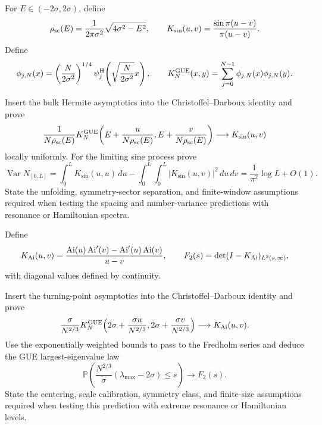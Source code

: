 \begin{exercise}
For $E\in(-2\sigma,2\sigma)$, define
\[
\rho_{\rm sc}(E)=\frac1{2\pi\sigma^2}\sqrt{4\sigma^2-E^2},
\qquad
K_{\sin}(u,v)=\frac{\sin\pi(u-v)}{\pi(u-v)}.
\]
Define
\[
\phi_{j,N}(x)
=\left(\frac{N}{2\sigma^2}\right)^{1/4}
\psi_j^{\rm H}\!\left(\sqrt{\frac{N}{2\sigma^2}}x\right),
\qquad
K_N^{\rm GUE}(x,y)=\sum_{j=0}^{N-1}\phi_{j,N}(x)\phi_{j,N}(y).
\]

Insert the bulk Hermite asymptotics into the Christoffel--Darboux identity
and prove
\[
\frac{1}{N\rho_{\rm sc}(E)}
K_N^{\rm GUE}\!\left(
E+\frac{u}{N\rho_{\rm sc}(E)},
E+\frac{v}{N\rho_{\rm sc}(E)}\right)
\longrightarrow K_{\sin}(u,v)
\]
locally uniformly.  For the limiting sine process prove
\[
\operatorname{Var}N_{[0,L]}
=\int_0^LK_{\sin}(u,u)\,du
-\int_0^L\!\int_0^L|K_{\sin}(u,v)|^2\,du\,dv
=\frac1{\pi^2}\log L+O(1).
\]
State the unfolding, symmetry-sector separation, and finite-window
assumptions required when testing the spacing and number-variance predictions
with resonance or Hamiltonian spectra.
\end{exercise}

\begin{exercise}
Define
\[
K_{\rm Ai}(u,v)
=\frac{\operatorname{Ai}(u)\operatorname{Ai}'(v)
-\operatorname{Ai}'(u)\operatorname{Ai}(v)}{u-v},
\qquad
F_2(s)=\det(I-K_{\rm Ai})_{L^2(s,\infty)},
\]
with diagonal values defined by continuity.

Insert the turning-point asymptotics into the Christoffel--Darboux identity
and prove
\[
\frac{\sigma}{N^{2/3}}
K_N^{\rm GUE}\!\left(
2\sigma+\frac{\sigma u}{N^{2/3}},
2\sigma+\frac{\sigma v}{N^{2/3}}\right)
\longrightarrow K_{\rm Ai}(u,v).
\]
Use the exponentially weighted bounds to pass to the Fredholm series and
deduce the GUE largest-eigenvalue law
\[
\mathbb P\!\left(
\frac{N^{2/3}}{\sigma}(\lambda_{\max}-2\sigma)\leq s\right)
\longrightarrow F_2(s).
\]
State the centering, scale calibration, symmetry class, and finite-size
assumptions required when testing this prediction with extreme resonance or
Hamiltonian levels.
\end{exercise}

